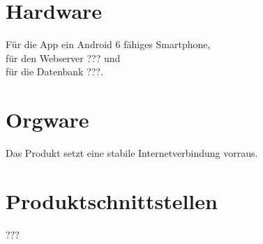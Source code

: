 \section{Hardware}

Für die App ein Android 6 fähiges Smartphone, \\
für den Webserver ??? und \\
für die Datenbank ???.

\section{Orgware}

Das Produkt setzt eine stabile Internetverbindung vorraus.

\section{Produktschnittstellen}

???